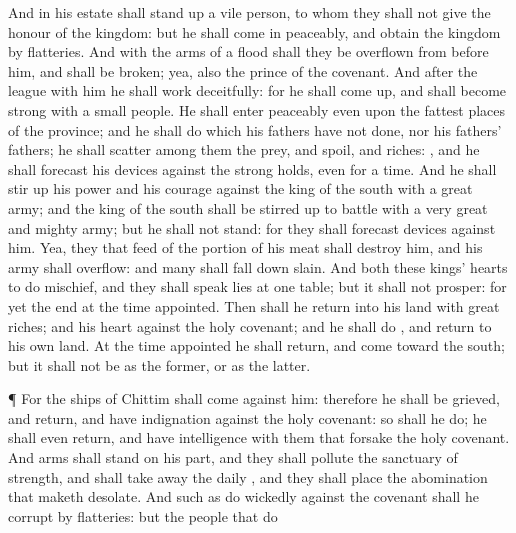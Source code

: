 {\par }{\PP {}And in his
estate shall stand
up a vile
person, to whom they shall not
give the
honour of the
kingdom: but he shall
come in
peaceably, and
obtain the
kingdom by
flatteries.
And with the
arms of a
flood shall they be
overflown from
before him, and shall be
broken; yea, also the
prince of the
covenant.
And after the
league
{} with him he shall
work
deceitfully: for he shall come
up, and shall become
strong with a
small
people.
He shall
enter
peaceably even upon the fattest
places of the
province; and he shall
do
{} which his
fathers have not
done, nor his
fathers’
fathers; he shall
scatter among them the
prey, and
spoil, and
riches:
{}, and he shall
forecast his
devices against the strong
holds, even for a
time.
And he shall stir
up his
power and his
courage against the
king of the
south with a
great
army; and the
king of the
south shall be stirred
up to
battle with a
very
great and
mighty
army; but he shall not
stand: for they shall
forecast
devices against him.
Yea, they that
feed of the portion of his
meat shall
destroy him, and his
army shall
overflow: and
many shall
fall down
slain.
And
both these
kings’
hearts
{} to do
mischief, and they shall
speak
lies at
one
table; but it shall not
prosper: for yet the
end
{} at the time
appointed.
Then shall he
return into his
land with
great
riches; and his
heart
{} against the
holy
covenant; and he shall
do
{}, and
return to his own
land.
At the time
appointed he shall
return, and
come toward the
south; but it shall not be as the
former, or as the
latter.
\par }{\PP {}¶ For the
ships of
Chittim shall
come against him: therefore he shall be
grieved, and
return, and have
indignation against the
holy
covenant: so shall he
do; he shall even
return, and have
intelligence with them that
forsake the
holy
covenant.
And
arms shall
stand on his part, and they shall
pollute the
sanctuary of
strength, and shall take
away the
daily
{}, and they shall
place the
abomination that maketh
desolate.
And such as do
wickedly against the
covenant shall he
corrupt by
flatteries: but the
people that do
}
